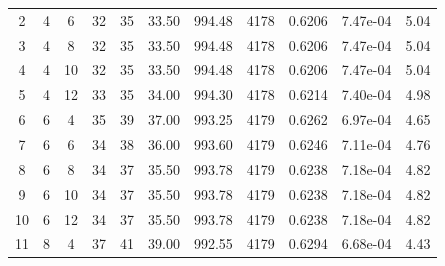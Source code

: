 {\begin{longtable}{|c|c|c|c|c|c|c|c|c|c|c|}
            2            & 4              & 6              & 32                  & 35                   & 33.50                & 994.48            & 4178               & 0.6206               & 7.47e-04         & 5.04            \\
            3            & 4              & 8              & 32                  & 35                   & 33.50                & 994.48            & 4178               & 0.6206               & 7.47e-04         & 5.04            \\
            4            & 4              & 10             & 32                  & 35                   & 33.50                & 994.48            & 4178               & 0.6206               & 7.47e-04         & 5.04            \\
            5            & 4              & 12             & 33                  & 35                   & 34.00                & 994.30            & 4178               & 0.6214               & 7.40e-04         & 4.98            \\ \hline
            6            & 6              & 4              & 35                  & 39                   & 37.00                & 993.25            & 4179               & 0.6262               & 6.97e-04         & 4.65            \\
            7            & 6              & 6              & 34                  & 38                   & 36.00                & 993.60            & 4179               & 0.6246               & 7.11e-04         & 4.76            \\
            8            & 6              & 8              & 34                  & 37                   & 35.50                & 993.78            & 4179               & 0.6238               & 7.18e-04         & 4.82            \\
            9            & 6              & 10             & 34                  & 37                   & 35.50                & 993.78            & 4179               & 0.6238               & 7.18e-04         & 4.82            \\
            10           & 6              & 12             & 34                  & 37                   & 35.50                & 993.78            & 4179               & 0.6238               & 7.18e-04         & 4.82            \\ \hline
            11           & 8              & 4              & 37                  & 41                   & 39.00                & 992.55            & 4179               & 0.6294               & 6.68e-04         & 4.43            \\

\end{longtable}}
